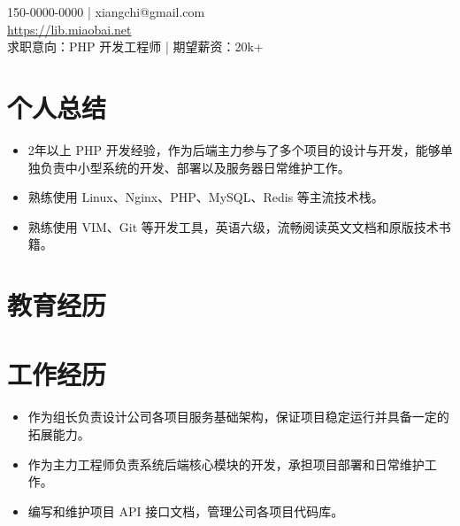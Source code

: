 \documentclass{resume}
\begin{document}
	\begin{center}
		150-0000-0000 | xiangchi@gmail.com\\
		\href{https://lib.miaobai.net}{https://lib.miaobai.net}\\
		求职意向：PHP 开发工程师 | 期望薪资：20k+
	\end{center}

	\section{个人总结}
	\begin{itemize}
		\item 2年以上 PHP 开发经验，作为后端主力参与了多个项目的设计与开发，能够单独负责中小型系统的开发、部署以及服务器日常维护工作。
		\item 熟练使用 Linux、Nginx、PHP、MySQL、Redis 等主流技术栈。
		\item 熟练使用 VIM、Git 等开发工具，英语六级，流畅阅读英文文档和原版技术书籍。
	\end{itemize}

	\section{教育经历}

	\section{工作经历}	
	\begin{itemize}
		\item 作为组长负责设计公司各项目服务基础架构，保证项目稳定运行并具备一定的拓展能力。
		\item 作为主力工程师负责系统后端核心模块的开发，承担项目部署和日常维护工作。
		\item 编写和维护项目 API 接口文档，管理公司各项目代码库。
	\end{itemize}
		
\end{document}
